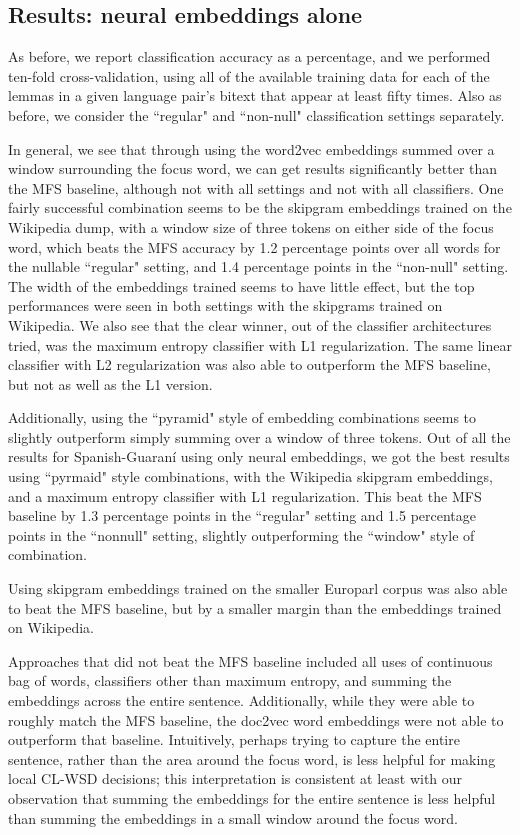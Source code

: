 \subsection{Results: neural embeddings alone}
As before, we report classification accuracy
as a percentage, and we performed ten-fold cross-validation, using all of the
available training data for each of the lemmas in a given language pair's
bitext that appear at least fifty times. Also as before, we consider the
``regular" and ``non-null" classification settings separately.

In general, we see that through using the word2vec embeddings summed over a
window surrounding the focus word, we can get results significantly better than
the MFS baseline, although not with all settings and not with all classifiers.
One fairly successful combination seems to be the skipgram embeddings trained
on the Wikipedia dump, with a window size of three tokens on either side of the
focus word, which beats the MFS accuracy by 1.2 percentage points over all
words for the nullable ``regular" setting, and 1.4 percentage points in the
``non-null" setting. The width of the embeddings trained seems to have little
effect, but the top performances were seen in both settings with the skipgrams
trained on Wikipedia. We also see that the clear winner, out of the classifier
architectures tried, was the maximum entropy classifier with L1 regularization.
The same linear classifier with L2 regularization was also able to outperform
the MFS baseline, but not as well as the L1 version.

Additionally, using the ``pyramid" style of embedding combinations seems to
slightly outperform simply summing over a window of three tokens. Out of all
the results for Spanish-Guaraní using only neural embeddings, we got the best
results using ``pyrmaid" style combinations, with the Wikipedia skipgram
embeddings, and a maximum entropy classifier with L1 regularization. This beat
the MFS baseline by 1.3 percentage points in the ``regular" setting and 1.5
percentage points in the ``nonnull" setting, slightly outperforming the
``window" style of combination.

Using skipgram embeddings trained on the smaller Europarl corpus was also able
to beat the MFS baseline, but by a smaller margin than the embeddings trained
on Wikipedia.

Approaches that did not beat the MFS baseline included all uses of continuous
bag of words, classifiers other than maximum entropy, and summing the
embeddings across the entire sentence. Additionally, while they were able to
roughly match the MFS baseline, the doc2vec word embeddings were not able to
outperform that baseline. Intuitively, perhaps trying to capture the entire
sentence, rather than the area around the focus word, is less helpful for
making local CL-WSD decisions; this interpretation is consistent at least with
our observation that summing the embeddings for the entire sentence is less
helpful than summing the embeddings in a small window around the focus word.

